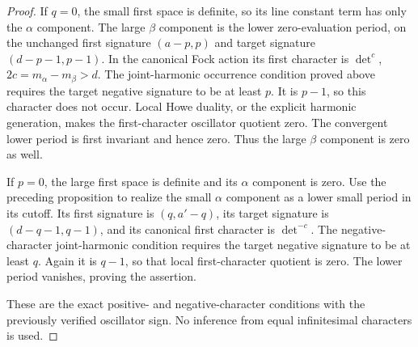 \begin{proof}
If \(q=0\), the small first space is definite, so its line
constant term has only the \(\alpha\) component.
The large \(\beta\) component is the lower zero-evaluation
period, on the unchanged first signature
\((a-p,p)\) and target signature
\((d-p-1,p-1)\).
In the canonical Fock action its first character is
\(\det^c\), \(2c=m_\alpha-m_\beta>d\).
The joint-harmonic occurrence condition proved above requires
the target negative signature to be at least \(p\).
It is \(p-1\), so this character does not occur.
Local Howe duality, or the explicit harmonic generation,
makes the first-character oscillator quotient zero.
The convergent lower period is first invariant and hence
zero. Thus the large \(\beta\) component is zero as well.

If \(p=0\), the large first space is definite and its
\(\alpha\) component is zero.
Use the preceding proposition to realize the small
\(\alpha\) component as a lower small period in its cutoff.
Its first signature is \((q,a'-q)\), its target signature is
\((d-q-1,q-1)\), and its canonical first character is
\(\det^{-c}\).
The negative-character joint-harmonic condition requires
the target negative signature to be at least \(q\).
Again it is \(q-1\), so that local first-character quotient
is zero. The lower period vanishes, proving the assertion.

These are the exact positive- and negative-character
conditions with the previously verified oscillator sign.
No inference from equal infinitesimal characters is used.
\end{proof}
